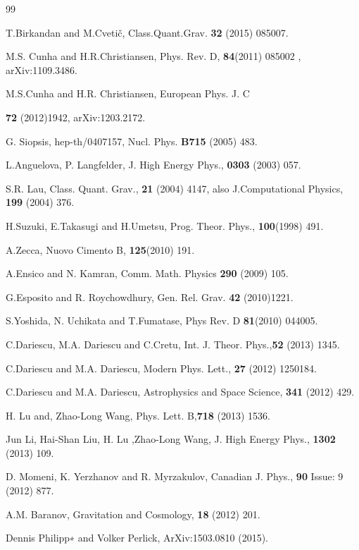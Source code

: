 \documentclass{article}
\begin{document}
\begin{thebibliography}{99}
{  T.Birkandan and M.Cveti\v{c}, Class.Quant.Grav. \textbf{32} (2015) 085007.

 M.S. Cunha and H.R.Christiansen, Phys. Rev. D, \textbf{84}(2011) 085002 , arXiv:1109.3486.

 M.S.Cunha and H.R. Christiansen, European Phys. J. C {\textbf {72} (2012)1942, arXiv:1203.2172.

 G. Siopsis, hep-th/0407157, Nucl. Phys. \textbf{B715} (2005) 483.

 L.Anguelova, P. Langfelder, J. High Energy Phys.,\textbf{ 0303} (2003) 057.

 S.R. Lau, Class. Quant. Grav., \textbf{21} (2004) 4147, also J.Computational Physics, \textbf{199} (2004) 376.

 H.Suzuki, E.Takasugi and H.Umetsu, Prog.  Theor. Phys., \textbf{100}(1998) 491.

 A.Zecca, Nuovo Cimento B, \textbf{125}(2010) 191.

 A.Ensico and N. Kamran, Comm.  Math. Physics \textbf{290} (2009) 105.

 G.Esposito and R. Roychowdhury, Gen. Rel.  Grav. \textbf{42} (2010)1221.

 S.Yoshida, N. Uchikata and T.Fumatase, Phys Rev. D \textbf{81}(2010) 044005.

 C.Dariescu, M.A. Dariescu and C.Cretu, Int. J. Theor. Phys.,\textbf{52} (2013) 1345.

 C.Dariescu and M.A. Dariescu, Modern Phys. Lett., \textbf{27} (2012) 1250184.

 C.Dariescu and M.A. Dariescu, Astrophysics and Space Science, \textbf{341} (2012) 429.

 H. Lu and, Zhao-Long Wang, Phys. Lett. B,\textbf{718} (2013) 1536.

 Jun Li, Hai-Shan Liu, H. Lu ,Zhao-Long Wang, J. High Energy Phys., \textbf{1302} (2013) 109.

 D. Momeni, K. Yerzhanov and R. Myrzakulov, Canadian J. Phys., \textbf{90} Issue: 9 (2012) 877.

 A.M. Baranov, Gravitation and Cosmology, \textbf{18} (2012) 201.

 Dennis Philipp∗ and Volker Perlick, ArXiv:1503.0810 (2015).

}}
\end{thebibliography}
\end{document}
